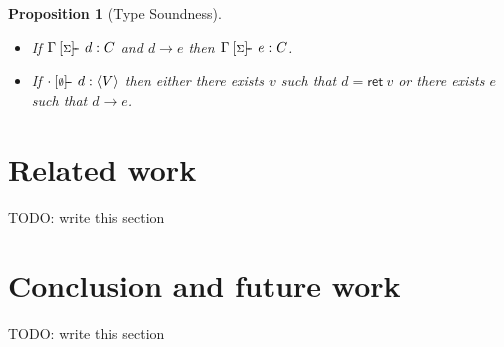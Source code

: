 \documentclass[preprint]{sigplanconf}
\newcommand{\reducesto}{\longrightarrow}
\newcommand{\sigentails}[1]{\mathbin{[{\text{\scriptsize ${#1}$}}]\!\text{-\!-}}\,}
\newcommand{\comp}[4]  {#1 \sigentails{#2} {#3} : {#4}}
\newcommand{\rt}[1]{\langle{#1}\rangle}   %
\newcommand{\compgs}{\comp{\Gamma}{\sigs}}
\newtheorem{proposition}[theorem]{Proposition}
\newcommand{\sigs}{\Sigma}
\newcommand{\key}[1]{\mathsf{#1}}
\begin{document}
\begin{proposition}[Type Soundness]
~
\begin{itemize}
\item If $\compgs{d}{C}$ and $d \reducesto e$ then $\compgs{e}{C}$.
\item If $\comp{\cdot}{\emptyset}{d}{\rt{V}}$ then either there exists $v$
  such that $d = \key{ret}~v$ or there exists $e$ such that $d \reducesto
  e$.
\end{itemize}
\end{proposition}

\section{Related work}
\label{sec:related}

TODO: write this section


\section{Conclusion and future work}
\label{sec:conclusion}

TODO: write this section



















\end{document}
